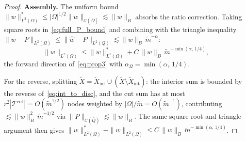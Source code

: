 \documentclass[11pt]{article}
\newtheorem{proposition}[theorem]{Proposition}
\newcommand{\C}{\mathcal{C}}
\begin{document}
\begin{proof}
\medskip\noindent\textbf{Assembly.}
The uniform bound $\|w\|^*_{L^2(\Omega)}\le|\Omega|^{1/2}\|w\|_{\C(\bar\Omega)}
\lesssim\|w\|_B$ absorbs the ratio correction. Taking square roots
in~\eqref{eq:full_P_bound} and combining with the triangle inequality
$\|w-P\|_{L^2(\Omega)}\le\|\hat w-P\|_{L^2(Q)}\lesssim\|w\|_B\,\tilde m^{-\alpha}$:
\[
  \|w\|_{L^2(\Omega)}\le\|w\|^*_{L^2(\Omega)}
   + C\,\|w\|_B\,\tilde m^{-\min(\alpha,\,1/4)},
\]
the forward direction of~\eqref{eq:prop3} with
$\alpha_\Omega=\min(\alpha,\,1/4)$.
 
For the reverse, splitting
$\tilde X=\tilde X_{\mathrm{int}}\cup(\tilde X\setminus\tilde X_{\mathrm{int}})$:
the interior sum is bounded by the reverse of~\eqref{eq:int_to_disc},
and the cut sum has at most
$r^2|\mathcal{T}^{\mathrm{cut}}|=O(\tilde m^{1/2})$ nodes weighted by
$|\Omega|/\tilde m=O(\tilde m^{-1})$, contributing
$\lesssim\|w\|^2_B\,\tilde m^{-1/2}$ via
$\|P\|_{\C(\bar Q)}\lesssim\|w\|_B$. The same square-root and triangle
argument then gives
$\|w\|^*_{L^2(\Omega)}-\|w\|_{L^2(\Omega)}\le C\,\|w\|_B\,\tilde m^{-\min(\alpha,\,1/4)}$.
\end{proof}
 



 
\end{document}
